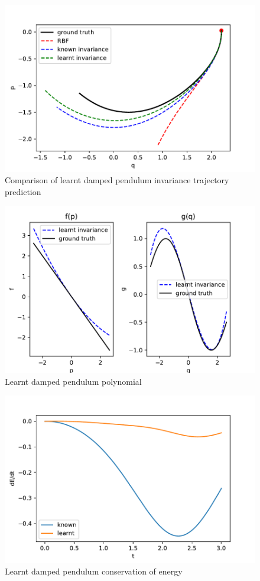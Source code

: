 \documentclass{statsmsc}
\begin{document}
\begin{figure}[H] 
  \includegraphics[width=0.6\linewidth]{../codes/figures/parameterised_damped_pendulum_predicted_trajectory.pdf}
  \centering
  \caption{Comparison of learnt damped pendulum invariance trajectory prediction}
  \label{fig:parameterised_damped_pendulum_trajectory}
\end{figure}

\begin{figure}[H] 
  \includegraphics[width=0.6\linewidth]{../codes/figures/parameterised_damped_pendulum_learnt_polynomial.pdf}
  \centering
  \caption{Learnt damped pendulum polynomial}
  \label{fig:parameterised_damped_pendulum_polynomial}
\end{figure}

\begin{figure}[H] 
  \includegraphics[width=0.6\linewidth]{../codes/figures/parameterised_damped_pendulum_conservation_of_energy.pdf}
  \centering
  \caption{Learnt damped pendulum conservation of energy}
  \label{fig:parameterised_damped_pendulum_conserve_energy}
\end{figure}
\end{document}
